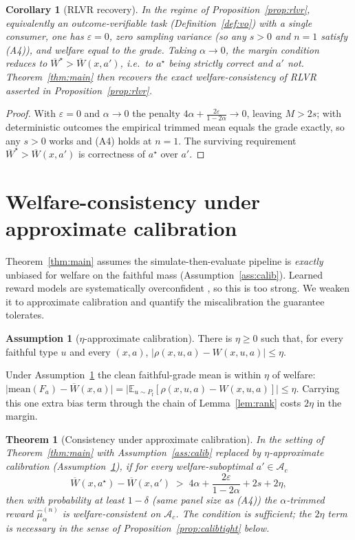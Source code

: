 \documentclass[11pt]{article}
\theoremstyle{plain}
\newtheorem{theorem}{Theorem}
\newtheorem{corollary}{Corollary}
\theoremstyle{definition}
\newtheorem{assumption}{Assumption}
\theoremstyle{remark}
\newcommand{\E}{\mathbb{E}}
\newcommand{\Ac}{\mathcal{A}}
\newcommand{\Wbar}{\overline{W}}
\newcommand{\eps}{\varepsilon}
\begin{document}
\begin{corollary}[RLVR recovery]
\label{cor:rlvr}
In the regime of Proposition~\ref{prop:rlvr}, equivalently an outcome-verifiable task
(Definition~\ref{def:vo}) with a single consumer, one has $\eps=0$, zero sampling variance (so
any $s>0$ and $n=1$ satisfy (A4)), and welfare equal to the grade. Taking $\alpha\to0$, the
margin condition reduces to $\Wbar^\star>\Wbar(x,a')$, i.e.\ to $a^\star$ being strictly correct
and $a'$ not. Theorem~\ref{thm:main} then recovers the exact welfare-consistency of RLVR
asserted in Proposition~\ref{prop:rlvr}.
\end{corollary}

\begin{proof}
With $\eps=0$ and $\alpha\to0$ the penalty $4\alpha+\frac{2\eps}{1-2\alpha}\to0$, leaving
$M>2s$; with deterministic outcomes the empirical trimmed mean equals the grade exactly, so
any $s>0$ works and (A4) holds at $n=1$. The surviving requirement
$\Wbar^\star>\Wbar(x,a')$ is correctness of $a^\star$ over $a'$.
\end{proof}


\section{Welfare-consistency under approximate calibration}
\label{sec:approxcalib}

Theorem~\ref{thm:main} assumes the simulate-then-evaluate pipeline is \emph{exactly} unbiased for
welfare on the faithful mass (Assumption~\ref{ass:calib}). Learned reward models are systematically
overconfident \cite{rewardcalib}, so this is too strong. We weaken it to approximate calibration
and quantify the miscalibration the guarantee tolerates.

\begin{assumption}[$\eta$-approximate calibration]
\label{ass:approxcalib}
There is $\eta\ge0$ such that, for every faithful type $u$ and every $(x,a)$,
$\bigl|\rho(x,u,a)-W(x,u,a)\bigr|\le\eta$.
\end{assumption}

Under Assumption~\ref{ass:approxcalib} the clean faithful-grade mean is within $\eta$ of welfare:
$\bigl|\mathrm{mean}(F_a)-\Wbar(x,a)\bigr|=\bigl|\E_{u\sim P_{\mathrm f}}[\rho(x,u,a)-W(x,u,a)]\bigr|\le\eta$.
Carrying this one extra bias term through the chain of Lemma~\ref{lem:rank} costs $2\eta$ in the
margin.

\begin{theorem}[Consistency under approximate calibration]
\label{thm:approxcalib}
In the setting of Theorem~\ref{thm:main} with Assumption~\ref{ass:calib} replaced by
$\eta$-approximate calibration (Assumption~\ref{ass:approxcalib}), if for every welfare-suboptimal
$a'\in\Ac_c$
\[
  \Wbar(x,a^\star)-\Wbar(x,a')\;>\;4\alpha+\frac{2\eps}{1-2\alpha}+2s+2\eta,
\]
then with probability at least $1-\delta$ (same panel size as \textup{(A4)}) the $\alpha$-trimmed
reward $\hat\mu_\alpha^{(n)}$ is welfare-consistent on $\Ac_c$. The condition is sufficient; the
$2\eta$ term is necessary in the sense of Proposition~\ref{prop:calibtight} below.
\end{theorem}
\end{document}
